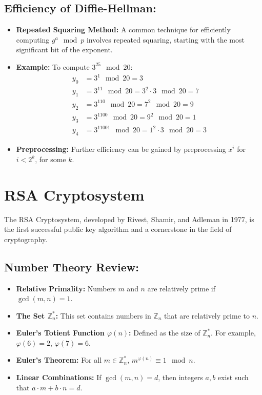 \documentclass[12pt]{article}
\begin{document}
\subsection*{Efficiency of Diffie-Hellman:}
\begin{itemize}
    \item \textbf{Repeated Squaring Method:} A common technique for efficiently computing \( g^a \mod p \) involves repeated squaring, starting with the most significant bit of the exponent.
    \item \textbf{Example:} To compute \( 3^{25} \mod 20 \):
    \begin{align*}
        y_0 &= 3^1 \mod 20 = 3 \\
        y_1 &= 3^{11} \mod 20 = 3^2 \cdot 3 \mod 20 = 7 \\
        y_2 &= 3^{110} \mod 20 = 7^2 \mod 20 = 9 \\
        y_3 &= 3^{1100} \mod 20 = 9^2 \mod 20 = 1 \\
        y_4 &= 3^{11001} \mod 20 = 1^2 \cdot 3 \mod 20 = 3
    \end{align*}
    \item \textbf{Preprocessing:} Further efficiency can be gained by preprocessing \( x^i \) for \( i < 2^k \), for some \( k \).
\end{itemize}


\section*{RSA Cryptosystem}

The RSA Cryptosystem, developed by Rivest, Shamir, and Adleman in 1977, is the first successful public key algorithm and a cornerstone in the field of cryptography.

\subsection*{Number Theory Review:}
\begin{itemize}
    \item \textbf{Relative Primality:} Numbers \( m \) and \( n \) are relatively prime if \( \gcd(m, n) = 1 \).
    \item \textbf{The Set \( \mathbb{Z}_n^* \):} This set contains numbers in \( \mathbb{Z}_n \) that are relatively prime to \( n \).
    \item \textbf{Euler's Totient Function \( \varphi(n) \):} Defined as the size of \( \mathbb{Z}_n^* \). For example, \( \varphi(6) = 2 \), \( \varphi(7) = 6 \).
    \item \textbf{Euler's Theorem:} For all \( m \in \mathbb{Z}_n^* \), \( m^{\varphi(n)} \equiv 1 \mod n \).
    \item \textbf{Linear Combinations:} If \( \gcd(m, n) = d \), then integers \( a, b \) exist such that \( a \cdot m + b \cdot n = d \).
\end{itemize}
\end{document}

